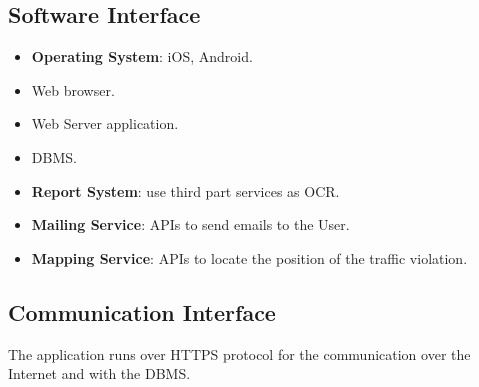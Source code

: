 \documentclass{report}
\begin{document}
\subsection{Software Interface}
\begin{itemize}
\item \textbf{Operating System}: iOS, Android.
\item Web browser.
\item Web Server application.
\item DBMS.
\item \textbf{Report System}: use third part services as OCR.
\item \textbf{Mailing Service}: APIs to send emails to the User.
\item \textbf{Mapping Service}: APIs to locate the position of the traffic violation.
\end{itemize}
\subsection{Communication Interface}
The application runs over HTTPS protocol for the communication over the Internet and with the DBMS.
\end{document}
